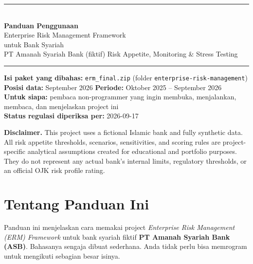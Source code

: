 \documentclass[11pt,a4paper]{article}
\newcommand{\file}[1]{\texttt{\small #1}}
\begin{document}
\sloppy
\begin{titlepage}
\thispagestyle{empty}
\vspace*{2.2cm}
{\color{navy}\rule{\linewidth}{2pt}}\\[1.2em]
{\Huge\bfseries\color{navy} Panduan Penggunaan}\\[0.6em]
{\LARGE\color{navy} Enterprise Risk Management Framework\\[0.2em] untuk Bank Syariah}\\[1.2em]
{\large PT Amanah Syariah Bank (fiktif) \textbullet{} Risk Appetite, Monitoring \& Stress Testing}\\[0.8em]
{\color{navy}\rule{\linewidth}{0.8pt}}
\vspace{1.6cm}

\begin{tcolorbox}[colback=softgrey,colframe=navy,boxrule=0.6pt,arc=2pt,left=10pt,right=10pt,top=8pt,bottom=8pt]
\textbf{Isi paket yang dibahas:} \file{erm\_\allowbreak{}final.zip} (folder \file{enterprise-risk-management})\\[0.3em]
\textbf{Posisi data:} September 2026 \textbullet{} \textbf{Periode:} Oktober 2025 -- September 2026\\[0.3em]
\textbf{Untuk siapa:} pembaca non-programmer yang ingin membuka, menjalankan, membaca, dan menjelaskan project ini\\[0.3em]
\textbf{Status regulasi diperiksa per:} 2026-09-17
\end{tcolorbox}

\vfill
{\small\color{gray}
\textbf{Disclaimer.} This project uses a fictional Islamic bank and fully synthetic data. All risk appetite thresholds, scenarios, sensitivities, and scoring rules are project-specific analytical assumptions created for educational and portfolio purposes. They do not represent any actual bank's internal limits, regulatory thresholds, or an official OJK risk profile rating.}
\end{titlepage}

\tableofcontents
\newpage
\section{Tentang Panduan Ini}

Panduan ini menjelaskan cara memakai project \emph{Enterprise Risk Management (ERM) Framework} untuk bank syariah fiktif \textbf{PT Amanah Syariah Bank (ASB)}. Bahasanya sengaja dibuat sederhana. Anda tidak perlu bisa memrogram untuk mengikuti sebagian besar isinya.
\end{document}
